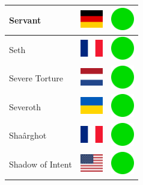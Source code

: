 \documentclass[12pt, a4paper, twoside]{report}
\begin{document}
\begin{center}
\begin{longtable}{|p{5cm}|p{2cm}|p{2cm}|}
 Servant                                                    & \includegraphics[width=1cm]{../img/flags/de} &   \includegraphics[width=1cm]{../likes/y} \\ \hline
 Seth                                                       & \includegraphics[width=1cm]{../img/flags/fr} &   \includegraphics[width=1cm]{../likes/y} \\ \hline
 Severe Torture                                             & \includegraphics[width=1cm]{../img/flags/nl} &   \includegraphics[width=1cm]{../likes/y} \\ \hline
 Severoth                                                   & \includegraphics[width=1cm]{../img/flags/ua} &   \includegraphics[width=1cm]{../likes/y} \\ \hline
 Shaârghot                                                  & \includegraphics[width=1cm]{../img/flags/fr} &   \includegraphics[width=1cm]{../likes/y} \\ \hline
 Shadow of Intent                                           & \includegraphics[width=1cm]{../img/flags/us} &   \includegraphics[width=1cm]{../likes/y} \\ \hline

\end{longtable}
\end{center}
\end{document}
